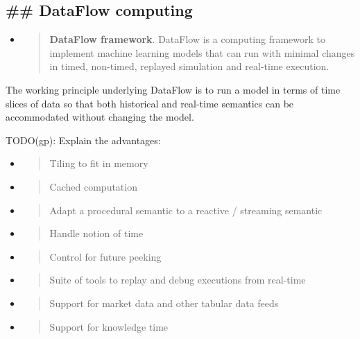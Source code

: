 \documentclass[11pt, reqno]{amsart}
\begin{document}
\hypertarget{dataflow-computing}{%
\subsection{\#\# DataFlow computing}\label{dataflow-computing}}

\begin{itemize}
\item
  \begin{quote}
  \textbf{DataFlow framework}. DataFlow is a computing framework to
  implement machine learning models that can run with minimal changes in
  timed, non-timed, replayed simulation and real-time execution.
  \end{quote}
\end{itemize}

The working principle underlying DataFlow is to run a model in terms of
time slices of data so that both historical and real-time semantics can
be accommodated without changing the model.

TODO(gp): Explain the advantages:

\begin{itemize}
\item
  \begin{quote}
  Tiling to fit in memory
  \end{quote}
\item
  \begin{quote}
  Cached computation
  \end{quote}
\item
  \begin{quote}
  Adapt a procedural semantic to a reactive / streaming semantic
  \end{quote}
\item
  \begin{quote}
  Handle notion of time
  \end{quote}
\item
  \begin{quote}
  Control for future peeking
  \end{quote}
\item
  \begin{quote}
  Suite of tools to replay and debug executions from real-time
  \end{quote}
\item
  \begin{quote}
  Support for market data and other tabular data feeds
  \end{quote}
\item
  \begin{quote}
  Support for knowledge time
  \end{quote}
\end{itemize}
\end{document}

